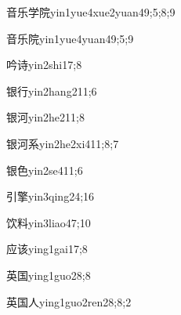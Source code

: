 \begin{verbete}{音乐学院}{yin1yue4xue2yuan4}{9;5;8;9}
\end{verbete}

\begin{verbete}{音乐院}{yin1yue4yuan4}{9;5;9}
\end{verbete}

\begin{verbete}{吟诗}{yin2shi1}{7;8}
\end{verbete}

\begin{verbete}{银行}{yin2hang2}{11;6}
\end{verbete}

\begin{verbete}{银河}{yin2he2}{11;8}
\end{verbete}

\begin{verbete}{银河系}{yin2he2xi4}{11;8;7}
\end{verbete}

\begin{verbete}{银色}{yin2se4}{11;6}
\end{verbete}

\begin{verbete}{引擎}{yin3qing2}{4;16}
\end{verbete}

\begin{verbete}{饮料}{yin3liao4}{7;10}
\end{verbete}

\begin{verbete}{应该}{ying1gai1}{7;8}
\end{verbete}

\begin{verbete}{英国}{ying1guo2}{8;8}
\end{verbete}

\begin{verbete}{英国人}{ying1guo2ren2}{8;8;2}
\end{verbete}


